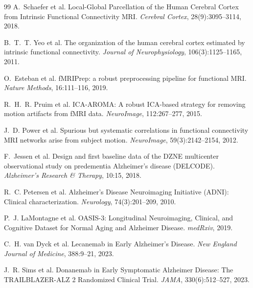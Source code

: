 \begin{thebibliography}{99}
A.~Schaefer et al.
\newblock Local-Global Parcellation of the Human Cerebral Cortex from Intrinsic Functional
  Connectivity MRI.
\newblock \emph{Cerebral Cortex}, 28(9):3095--3114, 2018.

B.~T.~T. Yeo et al.
\newblock The organization of the human cerebral cortex estimated by intrinsic functional
  connectivity.
\newblock \emph{Journal of Neurophysiology}, 106(3):1125--1165, 2011.

O.~Esteban et al.
\newblock fMRIPrep: a robust preprocessing pipeline for functional MRI.
\newblock \emph{Nature Methods}, 16:111--116, 2019.

R.~H.~R. Pruim et al.
\newblock ICA-AROMA: A robust ICA-based strategy for removing motion artifacts from fMRI
  data.
\newblock \emph{NeuroImage}, 112:267--277, 2015.

J.~D. Power et al.
\newblock Spurious but systematic correlations in functional connectivity MRI networks
  arise from subject motion.
\newblock \emph{NeuroImage}, 59(3):2142--2154, 2012.

F.~Jessen et al.
\newblock Design and first baseline data of the DZNE multicenter observational study on
  predementia Alzheimer's disease (DELCODE).
\newblock \emph{Alzheimer's Research \& Therapy}, 10:15, 2018.

R.~C. Petersen et al.
\newblock Alzheimer's Disease Neuroimaging Initiative (ADNI): Clinical characterization.
\newblock \emph{Neurology}, 74(3):201--209, 2010.

P.~J. LaMontagne et al.
\newblock OASIS-3: Longitudinal Neuroimaging, Clinical, and Cognitive Dataset for Normal
  Aging and Alzheimer Disease.
\newblock \emph{medRxiv}, 2019.

C.~H. van Dyck et al.
\newblock Lecanemab in Early Alzheimer's Disease.
\newblock \emph{New England Journal of Medicine}, 388:9--21, 2023.

J.~R. Sims et al.
\newblock Donanemab in Early Symptomatic Alzheimer Disease: The TRAILBLAZER-ALZ 2
  Randomized Clinical Trial.
\newblock \emph{JAMA}, 330(6):512--527, 2023.


\end{thebibliography}
